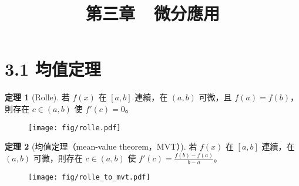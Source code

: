 \documentclass[12pt]{extarticle}
\newcommand{\ds}{\displaystyle}
\theoremstyle{definition}
\newtheorem*{thm}{定理}
\begin{document}
\title{\texorpdfstring{\vspace{-16mm} 第三章\ \ 微分應用}{第三章\ \ 微分應用}} 
\author{\vspace{-5em}}
\date{\vspace{-5em}}
\maketitle
\thispagestyle{firststyle}


\section*{3.1 均值定理}

\begin{thm}[Rolle]
  若 $f(x)$ 在 $[a, b]$ 連續，在 $(a, b)$ 可微，且 $f(a) = f(b)$，則存在 $\ds c\in (a, b)$ 使 $\ds f'(c)=0$。
\end{thm}
\vspace{-7mm}
\begin{figure}[!htbp]
  \centering
  \texttt{[image: fig/rolle.pdf]}
\end{figure}

\begin{thm}[均值定理（mean-value theorem，MVT）]
  若 $f(x)$ 在 $[a, b]$ 連續，在 $(a, b)$ 可微，則存在 $\ds c\in (a, b)$ 使 $\ds f'(c) = \frac{f(b) - f(a)}{b - a}$。
\end{thm}
\vspace{-1cm}
\begin{figure}[!htbp]
  \centering
  \texttt{[image: fig/rolle\_to\_mvt.pdf]}
\end{figure}
\end{document}
